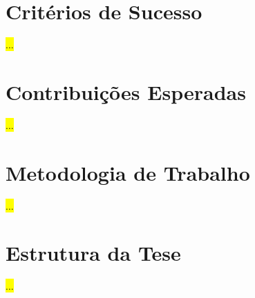 \section{Critérios de Sucesso}
\label{sec:chap1_success_criteria}
\hl{...}

\section{Contribuições Esperadas}
\label{sec:chap1_contribuitions}
\hl{...}

\section{Metodologia de Trabalho}
\label{sec:chap1_methodology}
\hl{...}

\section{Estrutura da Tese}
\label{sec:chap1_structure}
\hl{...}
